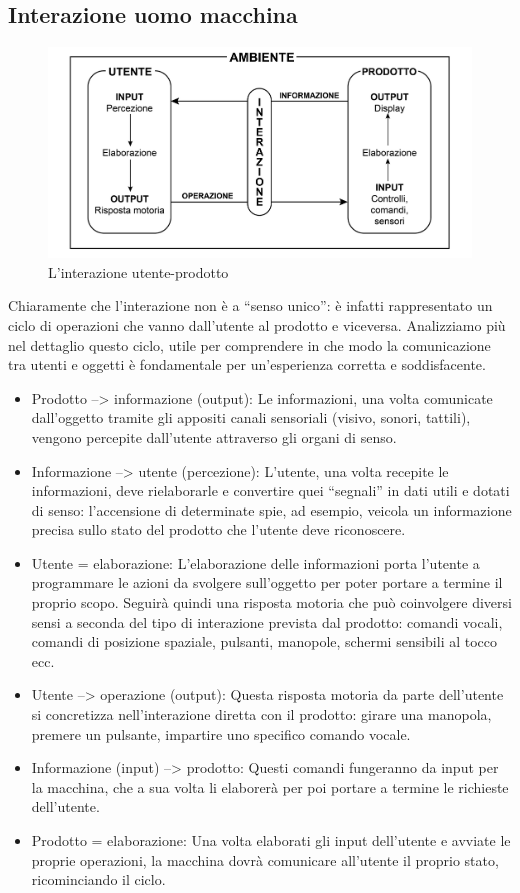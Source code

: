 \documentclass[11pt,a4paper]{article}
\begin{document}
\subsection{Interazione uomo macchina}
\begin{figure}
	\begin{center}
		\includegraphics[scale=0.3]{img/003.png}
	\end{center}
	\caption{L'interazione utente-prodotto}
\end{figure}
Chiaramente che l’interazione non è a “senso unico”: è infatti rappresentato un ciclo di operazioni che vanno dall’utente al prodotto e viceversa. Analizziamo più nel dettaglio questo ciclo, utile per comprendere in che modo la comunicazione tra utenti e oggetti è fondamentale per un’esperienza corretta e soddisfacente.
\begin{itemize}
	\item Prodotto --> informazione (output): Le informazioni, una volta comunicate dall’oggetto tramite gli appositi canali sensoriali (visivo, sonori, tattili), vengono percepite dall’utente attraverso gli organi di senso.
	\item Informazione --> utente (percezione): L’utente, una volta recepite le informazioni, deve rielaborarle e convertire quei “segnali” in dati utili e dotati di senso: l’accensione di determinate spie, ad esempio, veicola un informazione precisa sullo stato del prodotto che l’utente deve riconoscere.
	\item Utente = elaborazione: L’elaborazione delle informazioni porta l’utente a programmare le azioni da svolgere sull’oggetto per poter portare a termine il proprio scopo. Seguirà quindi una risposta motoria che può coinvolgere diversi sensi a seconda del tipo di interazione prevista dal prodotto: comandi vocali, comandi di posizione spaziale, pulsanti, manopole, schermi sensibili al tocco ecc.
	\item Utente --> operazione (output): Questa risposta motoria da parte dell’utente si concretizza nell’interazione diretta con il prodotto: girare una manopola, premere un pulsante, impartire uno specifico comando vocale.
	\item Informazione (input) --> prodotto: Questi comandi fungeranno da input per la macchina, che a sua volta li elaborerà per poi portare a termine le richieste dell’utente.
	\item Prodotto = elaborazione: Una volta elaborati gli input dell’utente e avviate le proprie operazioni, la macchina dovrà comunicare all’utente il proprio stato, ricominciando il ciclo.
\end{itemize}
\end{document}

